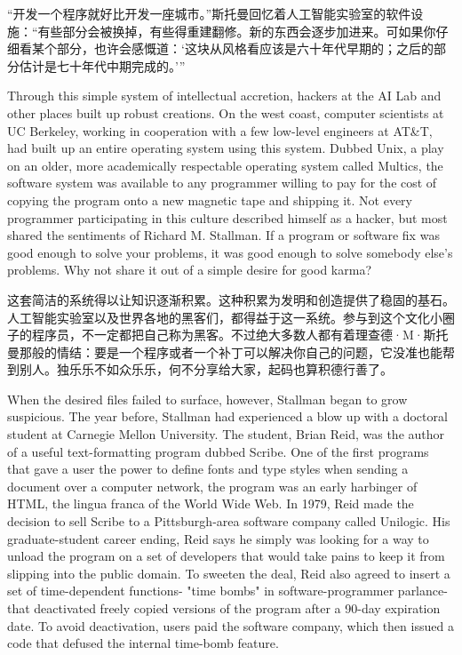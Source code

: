 \ifdefined\chs
``开发一个程序就好比开发一座城市。''斯托曼回忆着人工智能实验室的软件设施：``有些部分会被换掉，有些得重建翻修。新的东西会逐步加进来。可如果你仔细看某个部分，也许会感慨道：`这块从风格看应该是六十年代早期的；之后的部分估计是七十年代中期完成的。'\hspace{0.01in}''
\fi

\ifdefined\eng
Through this simple system of intellectual accretion, hackers at the AI Lab and other places built up robust creations. On the west coast, computer scientists at UC Berkeley, working in cooperation with a few low-level engineers at AT\&T, had built up an entire operating system using this system. Dubbed Unix, a play on an older, more academically respectable operating system called Multics, the software system was available to any programmer willing to pay for the cost of copying the program onto a new magnetic tape and shipping it. Not every programmer participating in this culture described himself as a hacker, but most shared the sentiments of Richard M. Stallman. If a program or software fix was good enough to solve your problems, it was good enough to solve somebody else's problems. Why not share it out of a simple desire for good karma?
\fi

\ifdefined\chs
这套简洁的系统得以让知识逐渐积累。这种积累为发明和创造提供了稳固的基石。人工智能实验室以及世界各地的黑客们，都得益于这一系统。参与到这个文化小圈子的程序员，不一定都把自己称为黑客。不过绝大多数人都有着理查德·M·斯托曼那般的情结：要是一个程序或者一个补丁可以解决你自己的问题，它没准也能帮到别人。独乐乐不如众乐乐，何不分享给大家，起码也算积德行善了。
\fi

\ifdefined\eng
When the desired files failed to surface, however, Stallman began to grow suspicious. The year before, Stallman had experienced a blow up with a doctoral student at Carnegie Mellon University. The student, Brian Reid, was the author of a useful text-formatting program dubbed Scribe. One of the first programs that gave a user the power to define fonts and type styles when sending a document over a computer network, the program was an early harbinger of HTML, the lingua franca of the World Wide Web. In 1979, Reid made the decision to sell Scribe to a Pittsburgh-area software company called Unilogic. His graduate-student career ending, Reid says he simply was looking for a way to unload the program on a set of developers that would take pains to keep it from slipping into the public domain. To sweeten the deal, Reid also agreed to insert a set of time-dependent functions- "time bombs" in software-programmer parlance-that deactivated freely copied versions of the program after a 90-day expiration date. To avoid deactivation, users paid the software company, which then issued a code that defused the internal time-bomb feature.
\fi

